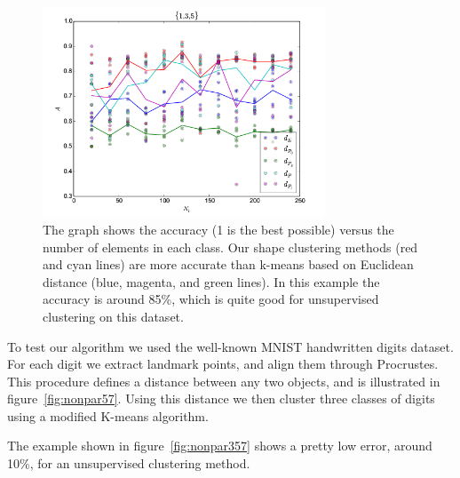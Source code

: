 \documentclass[simplex.tex]{subfiles}
\begin{document}
\begin{figure}[h!]
\begin{cframed}
\centering
\includegraphics[width=0.75\textwidth]{./figs/nonpar135.png}
\caption{
The graph shows the accuracy
(1 is the best possible) versus the number of elements in each class.
Our shape clustering methods (red and cyan lines) are more accurate than
k-means based on Euclidean distance (blue, magenta, and green lines). In
this example the accuracy is around 85\%, which is quite good for
unsupervised clustering on this dataset.
}
\label{fig:nonpar135}
\end{cframed}
\end{figure}

To test our algorithm we used the well-known MNIST handwritten digits
dataset. For each digit we extract landmark points, and align them
through Procrustes. This procedure defines a distance between any two
objects, and is illustrated in figure~\ref{fig:nonpar57}. Using this
distance we then cluster three classes of digits using a modified
K-means algorithm. 

The example shown in figure~\ref{fig:nonpar357}
shows a pretty low error, around 10\%, for an unsupervised clustering
method.
\end{document}

